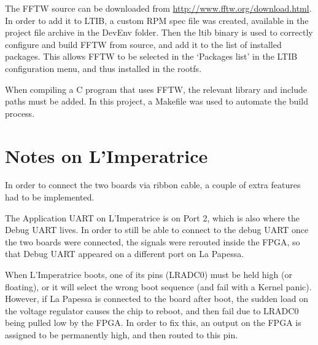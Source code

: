 		The FFTW source can be downloaded from \href{http://www.fftw.org/download.html}{http://www.fftw.org/download.html}.  In order to add it to LTIB, a custom RPM spec file was created, available in the project file archive in the DevEnv folder.  Then the ltib binary is used to correctly configure and build FFTW from source, and add it to the list of installed packages.  This allows FFTW to be selected in the `Packages list' in the LTIB configuration menu, and thus installed in the rootfs.

		When compiling a C program that uses FFTW, the relevant library and include paths must be added.  In this project, a Makefile was used to automate the build process.


\section{Notes on L'Imperatrice} %
\label{apdx:notes_on_l_imperatrice}
	In order to connect the two boards via ribbon cable, a couple of extra features had to be implemented.

	The Application UART on L'Imperatrice is on Port 2, which is also where the Debug UART lives.  In order to still be able to connect to the debug UART once the two boards were connected, the signals were rerouted inside the FPGA, so that Debug UART appeared on a different port on La Papessa.

	When L'Imperatrice boots, one of its pins (LRADC0) must be held high (or floating), or it will select the wrong boot sequence (and fail with a Kernel panic).  However, if La Papessa is connected to the board after boot, the sudden load on the voltage regulator causes the chip to reboot, and then fail due to LRADC0 being pulled low by the FPGA.  In order to fix this, an output on the FPGA is assigned to be permanently high, and then routed to this pin.

